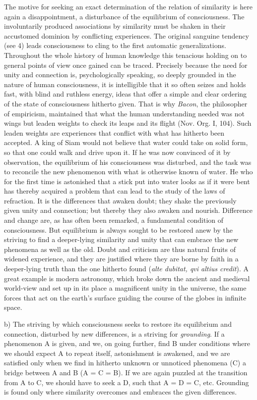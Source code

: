 \documentclass[12pt,a4paper]{book}
\newcommand{\opage}[1]{\marginnote{\footnotesize\textit{[#1]}}}
\begin{document}
The motive for seeking an exact determination of the relation of
similarity is here again a disappointment, a disturbance of the
equilibrium of consciousness. The involuntarily produced associations by
similarity must be shaken in their accustomed dominion by conflicting
experiences. The original sanguine tendency (see 4) leads consciousness
to cling to the first automatic generalizations. Throughout the whole
history of human knowledge this tenacious holding on to general points
of view once gained can be traced. Precisely because the need for unity
and connection is, psychologically speaking, so deeply grounded in the
nature of human consciousness, it is intelligible that it so often
seizes and holds fast, with blind and ruthless energy, ideas that offer a
simple and clear ordering of the state of consciousness hitherto given.
That is why \emph{Bacon}, the philosopher of empiricism, maintained that
what the human understanding needed was not wings but leaden weights to
check its leaps and its flight (Nov. Org. I, 104). Such leaden weights
are experiences that conflict with what has hitherto been accepted. A
king of Siam would not believe that water could
\opage{212}take on solid form, so that one could walk and drive upon it.
If he was now convinced of it by observation, the equilibrium of his
consciousness was disturbed, and the task was to reconcile the new
phenomenon with what is otherwise known of water. He who for the first
time is astonished that a stick put into water looks as if it were bent
has thereby acquired a problem that can lead to the study of the laws of
refraction. It is the differences that awaken doubt; they shake the
previously given unity and connection; but thereby they also awaken and
nourish. Difference and change are, as has often been remarked, a
fundamental condition of consciousness. But equilibrium is always sought
to be restored anew by the striving to find a deeper-lying similarity
and unity that can embrace the new phenomena as well as the old. Doubt
and criticism are thus natural fruits of widened experience, and they
are justified where they are borne by faith in a deeper-lying truth than
the one hitherto found (\textit{alte dubitat, qvi altius credit}). A
great example is modern astronomy, which broke down the ancient and
medieval world-view and set up in its place a magnificent unity in the
universe, the same forces that act on the earth's surface guiding the
course of the globes in infinite space.

b) The striving by which consciousness seeks to restore its equilibrium
and connection, disturbed by new differences, is a striving for
\emph{grounding}. If a phenomenon A is given, and we, on going further,
find B under conditions where we should expect A to repeat itself,
astonishment is awakened, and we are satisfied only when we find in
hitherto unknown or unnoticed phenomena (C) a bridge between A and B
(A = C = B). If we are again puzzled at the transition from A to C, we
should have to seek a D, such that A = D = C, etc. Grounding is found
only where similarity overcomes and embraces the given differences.
\end{document}
